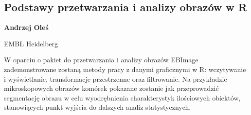 \documentclass[\main/boa.tex]{subfiles}
\begin{document}
\subsection{Podstawy przetwarzania i analizy obrazów w R }

\begin{minipage}{0.915\textwidth}
	\centering
  {\bf {} Andrzej Oleś}
\end{minipage}



\begin{affiliations}
\begin{minipage}{0.915\textwidth}
\centering
EMBL Heidelberg \\[-2pt]
\end{minipage}
\end{affiliations}

\vskip 0.3cm

W oparciu o pakiet do przetwarzania i analizy obrazów EBImage zademonstrowane zostaną metody pracy z danymi graficznymi w R: wczytywanie i wyświetlanie, transformacje przestrzenne oraz filtrowanie. Na przykładzie mikroskopowych obrazów komórek pokazane zostanie jak przeprowadzić segmentację obrazu w celu wyodrębnienia charakterystyk ilościowych obiektów, stanowiących punkt wyjścia do dalszych analiz statystycznych. 
\end{document}
